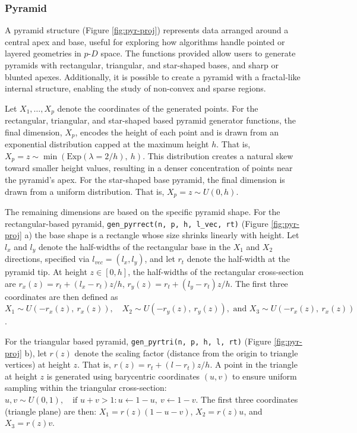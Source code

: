 \subsubsection{Pyramid}\label{pyramid}

A pyramid structure (Figure \ref{fig:pyr-proj}) represents data arranged around a central apex and base, useful for exploring how algorithms handle pointed or layered geometries in \(p\text{-}D\) space. The functions provided allow users to generate pyramids with rectangular, triangular, and star-shaped bases, and sharp or blunted apexes. Additionally, it is possible to create a pyramid with a fractal-like internal structure, enabling the study of non-convex and sparse regions.

Let \(X_1, \dots, X_p\) denote the coordinates of the generated points. For the rectangular, triangular, and star-shaped based pyramid generator functions, the final dimension, \(X_p\), encodes the height of each point and is drawn from an exponential distribution capped at the maximum height \(h\). That is, \(X_p = z \sim \min\left(\text{Exp}(\lambda = 2/h),\ h\right).\) This distribution creates a natural skew toward smaller height values, resulting in a denser concentration of points near the pyramid's apex. For the star-shaped base pyramid, the final dimension is drawn from a uniform distribution. That is, \(X_p = z \sim U(0, h)\).

The remaining dimensions are based on the specific pyramid shape. For the rectangular-based pyramid, \texttt{gen\_pyrrect(n,\ p,\ h,\ l\_vec,\ rt)} (Figure \ref{fig:pyr-proj} a) the base shape is a rectangle whose size shrinks linearly with height. Let \(l_x\) and \(l_y\) denote the half-widths of the rectangular base in the \(X_1\) and \(X_2\) directions, specified via \(l_{vec}=(l_x,l_y)\), and let \(r_t\) denote the half-width at the pyramid tip. At height \(z\in [0,h]\), the half-widths of the rectangular cross-section are \(r_x(z) = r_t + (l_x - r_t)z/h\), \(r_y(z) = r_t + (l_y - r_t)z/h\). The first three coordinates are then defined as \(X_1 \sim U(-r_x(z),\ r_x(z)), \quad X_2 \sim U(-r_y(z),\ r_y(z)),\text{ and }X_3 \sim U(-r_x(z),\ r_x(z))\).

For the triangular based pyramid, \texttt{gen\_pyrtri(n,\ p,\ h,\ l,\ rt)} (Figure \ref{fig:pyr-proj} b), let \(r(z)\) denote the scaling factor (distance from the origin to triangle vertices) at height \(z\). That is, \(r(z) = r_t + (l-r_t)z/h\). A point in the triangle at height \(z\) is generated using barycentric coordinates \((u, v)\) to ensure uniform sampling within the triangular cross-section: \(u, v \sim U(0, 1), \quad \text{if } u + v > 1: u \leftarrow 1 - u,\ v \leftarrow 1 - v\). The first three coordinates (triangle plane) are then: \(X_1 = r(z)(1 - u - v)\), \(X_2 = r(z)u\), and \(X_3 = r(z)v.\)

